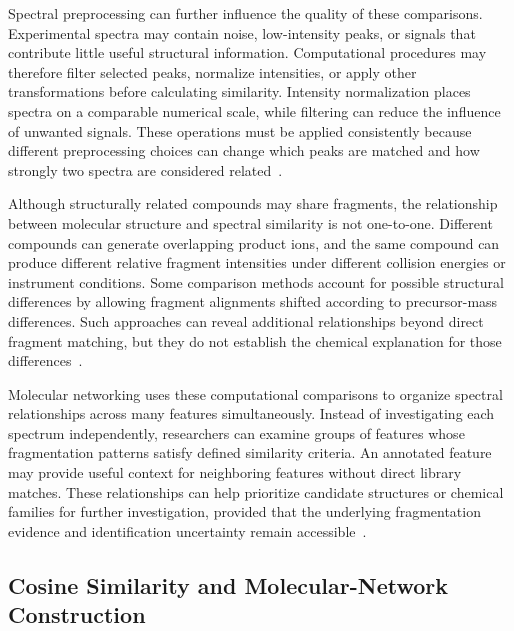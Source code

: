         Spectral preprocessing can further influence the quality of these comparisons. Experimental spectra may contain noise, low-intensity peaks, or signals that contribute little useful structural information. Computational procedures may therefore filter selected peaks, normalize intensities, or apply other transformations before calculating similarity. Intensity normalization places spectra on a comparable numerical scale, while filtering can reduce the influence of unwanted signals. These operations must be applied consistently because different preprocessing choices can change which peaks are matched and how strongly two spectra are considered related~\cite{Bittremieux2022,DallaValle2025}.

        Although structurally related compounds may share fragments, the relationship between molecular structure and spectral similarity is not one-to-one. Different compounds can generate overlapping product ions, and the same compound can produce different relative fragment intensities under different collision energies or instrument conditions. Some comparison methods account for possible structural differences by allowing fragment alignments shifted according to precursor-mass differences. Such approaches can reveal additional relationships beyond direct fragment matching, but they do not establish the chemical explanation for those differences~\cite{Bittremieux2022,Schmid2021}.

        Molecular networking uses these computational comparisons to organize spectral relationships across many features simultaneously. Instead of investigating each spectrum independently, researchers can examine groups of features whose fragmentation patterns satisfy defined similarity criteria. An annotated feature may provide useful context for neighboring features without direct library matches. These relationships can help prioritize candidate structures or chemical families for further investigation, provided that the underlying fragmentation evidence and identification uncertainty remain accessible~\cite{Wang2016,Nothias2020,Ernst2019}.

    \subsection{Cosine Similarity and Molecular-Network Construction}\label{subsec:cosine-network}

